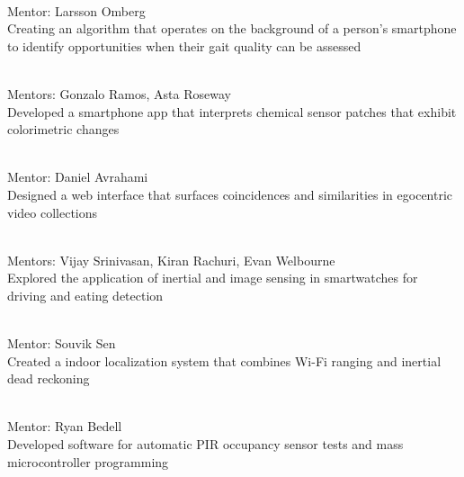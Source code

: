  \\
Mentor: Larsson Omberg \\
Creating an algorithm that operates on the background of a person's smartphone to identify opportunities when their gait quality can be assessed
\vspace{5pt}

 \\
Mentors: Gonzalo Ramos, Asta Roseway \\
Developed a smartphone app that interprets chemical sensor patches that exhibit colorimetric changes
\vspace{5pt}

 \\
Mentor: Daniel Avrahami \\
Designed a web interface that surfaces coincidences and similarities in egocentric video collections
\vspace{5pt}

 \\
Mentors: Vijay Srinivasan, Kiran Rachuri, Evan Welbourne \\
Explored the application of inertial and image sensing in smartwatches for driving and eating detection
\vspace{5pt}

 \\
Mentor: Souvik Sen \\
Created a indoor localization system that combines Wi-Fi ranging and inertial dead reckoning
\vspace{5pt}

 \\
Mentor: Ryan Bedell \\
Developed software for automatic PIR occupancy sensor tests and mass microcontroller programming
